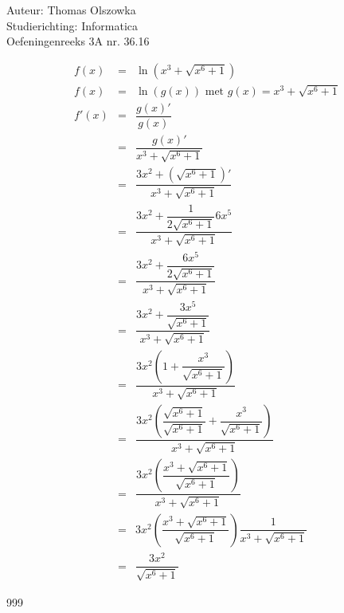 \documentclass[a4paper]{article}
\begin{document}
\noindent \large Auteur: Thomas Olszowka \\
\noindent \large Studierichting: Informatica\\
\noindent \large Oefeningenreeks 3A nr. 36.16\\

\medskip

\normalsize

\begin{eqnarray*}
f(x)    & = &  \ln (x^3 + \sqrt{x^6 + 1}) \\
f(x)    & = &  \ln (g(x)) \text{ met } g(x) = x^3 + \sqrt{x^6 + 1}\\
f'(x)   & = & \dfrac{g(x)'}{g(x)}  \\
        & = & \dfrac{g(x)'}{x^3 + \sqrt{x^6 + 1}} \\
        & = & \dfrac{3x^2 + (\sqrt{x^6 + 1})'}{x^3 + \sqrt{x^6 + 1}} \\
        & = & \dfrac{3x^2 + \dfrac{1}{2 \sqrt{x^6 + 1}} 6x^5}{x^3 + \sqrt{x^6 + 1}} \\
        & = & \dfrac{3x^2 + \dfrac{6x^5}{2 \sqrt{x^6 + 1}} }{x^3 + \sqrt{x^6 + 1}} \\
        & = & \dfrac{3x^2 + \dfrac{3x^5}{ \sqrt{x^6 + 1}} }{x^3 + \sqrt{x^6 + 1}} \\
        & = & \dfrac{3x^2 \left(1 + \dfrac{x^3}{ \sqrt{x^6 + 1}}\right)}{x^3 + \sqrt{x^6 + 1}} \\
        & = & \dfrac{3x^2 \left(\dfrac{\sqrt{x^6 + 1}}{\sqrt{x^6 + 1}} + \dfrac{x^3}{ \sqrt{x^6 + 1}}\right)}{x^3 + \sqrt{x^6 + 1}} \\
        & = & \dfrac{3x^2 \left(\dfrac{x^3 + \sqrt{x^6 + 1}}{\sqrt{x^6 + 1}}\right)}{x^3 + \sqrt{x^6 + 1}} \\
        & = & 3x^2 \left(\dfrac{x^3 + \sqrt{x^6 + 1}}{\sqrt{x^6 + 1}}\right) \dfrac{1}{x^3 + \sqrt{x^6 + 1}} \\
        & = & \dfrac{3x^2}{\sqrt{x^6 + 1}}
\end{eqnarray*}

\begin{thebibliography}{999}
\end{thebibliography}
\end{document}
